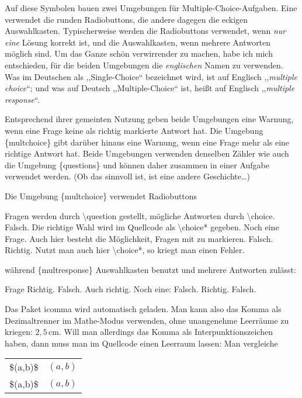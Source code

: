 \documentclass[hyperworksheet]{drcschool}
\newcommand*{\cs}[1]{\textup{\ttfamily\textbackslash#1}}                   %
\newcommand*{\pkg}[1]{\textup{\ttfamily#1}}                                %
\newcommand*{\opt}[1]{\textup{\ttfamily#1}}                                %
\newcommand*{\env}[1]{\textup{\ttfamily\{#1\}}}                            %
\begin{document}
\begin{worksheet}
Auf diese Symbolen bauen zwei Umgebungen für Multiple-Choice-Aufgaben. Eine
verwendet die runden Radiobuttons, die andere dagegen die eckigen Auswahlkasten.
Typischerweise werden die Radiobuttons verwendet, wenn \emph{nur eine} Lösung
korrekt ist, und die Auswahlkasten, wenn mehrere Antworten möglich sind. Um das
Ganze schön verwirrender zu machen, habe ich mich entschieden, für die beiden
Umgebungen die \emph{englischen} Namen zu verwenden. Was im Deutschen als
,,Single-Choice`` bezeichnet wird, ist auf Englisch ,,\emph{multiple choice}``;
und was auf Deutsch ,,Multiple-Choice`` ist, heißt auf Englisch
,,\emph{multiple response}``.

Entsprechend ihrer gemeinten Nutzung geben beide Umgebungen eine Warnung,
wenn eine Frage keine als richtig markierte Antwort hat. Die Umgebung \env{multchoice}
gibt darüber hinaus eine Warnung, wenn eine Frage mehr als eine richtige Antwort
hat. Beide Umgebungen verwenden denselben Zähler wie auch die Umgebung
\env{questions} und können daher zusammen in einer Aufgabe
verwendet werden. (Ob das sinnvoll ist, ist eine andere Geschichte\ldots)

Die Umgebung \env{multchoice} verwendet Radiobuttons
\begin{multchoice}
\question Fragen werden durch \cs{question} gestellt,
   \choice mögliche Antworten durch \cs{choice}.
   \choice Falsch.
   \choice* Die richtige Wahl wird im Quellcode als \cs{choice*} gegeben.
\question* Noch eine Frage. Auch hier besteht die Möglichkeit, Fragen mit \opt{*} zu markieren.
   \choice Falsch.
   \choice* Richtig.
   \choice Nutzt man auch hier \cs{choice*}, so kriegt man einen Fehler.
\end{multchoice}
während \env{multresponse} Auswahlkasten benutzt und mehrere Antworten zulässt:
\begin{multresponse}
\question Frage
   \choice* Richtig.
   \choice Falsch.
   \choice* Auch richtig.
\question Noch eine:
   \choice Falsch.
   \choice* Richtig.
   \choice Falsch.
\end{multresponse}

Das Paket \pkg{icomma} wird automatisch geladen. Man kann also das Komma als Dezimaltrenner
im Mathe-Modus verwenden, ohne unangenehme Leerräume zu kriegen: $2,5\,\mathrm{cm}$.
Will man allerdings das Komma als Interpunktionszeichen haben, dann muss man im Quellcode
einen Leerraum lassen: Man vergleiche
\begin{tabular}[t]{l@{\space\textrightarrow\space}l}
\opt{\$(a,b)\$}  & $(a,b)$ \\
\opt{\$(a,\textvisiblespace b)\$} & $(a, b)$
\end{tabular}

\end{worksheet}
\end{document}
